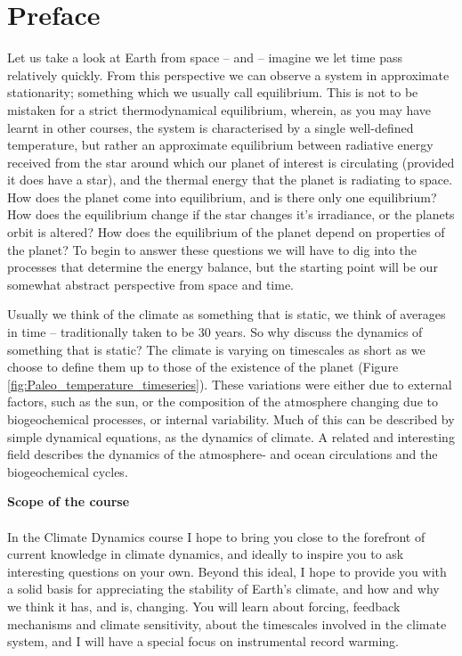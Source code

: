 \documentclass[12pt]{book}
\title{\DocTitle}
\author{Thorsten Mauritsen}
\date{\today}
\begin{document}
 
\maketitle
\tableofcontents



\frontmatter
{}
\chapter{Preface}
Let us take a look at Earth from space -- and -- imagine we let time pass relatively quickly. From this perspective we can observe a system in approximate stationarity; something which we usually call equilibrium. This is not to be mistaken for a strict thermodynamical equilibrium, wherein, as you may have learnt in other courses, the system is characterised by a single well-defined temperature, but rather an approximate equilibrium between radiative energy received from the star around which our planet of interest is circulating (provided it does have a star), and the thermal energy that the planet is radiating to space. How does the planet come into equilibrium, and is there only one equilibrium? How does the equilibrium change if the star changes it's irradiance, or the planets orbit is altered? How does the equilibrium of the planet depend on properties of the planet? To begin to answer these questions we will have to dig into the processes that determine the energy balance, but the starting point will be our somewhat abstract perspective from space and time.

Usually we think of the climate as something that is static, we think of averages in time -- traditionally taken to be 30 years. So why discuss the dynamics of something that is static? The climate is varying on timescales as short as we choose to define them up to those of the existence of the planet (Figure \ref{fig:Paleo_temperature_timeseries}). These variations were either due to external factors, such as the sun, or  the composition of the atmosphere changing due to biogeochemical processes, or internal variability. Much of this can be described by simple dynamical equations, as the dynamics of climate. A related and interesting field describes the dynamics of the atmosphere- and ocean circulations and the biogeochemical cycles. 

\vspace{1.0 cm}
\noindent
{\bf \LARGE Scope of the course}
\\
\\
\noindent In the Climate Dynamics course I hope to bring you close to the forefront of current knowledge in climate dynamics, and ideally to inspire you to ask interesting questions on your own. Beyond this ideal, I hope to provide you with a solid basis for appreciating the stability of Earth's climate, and how and why we think it has, and is, changing. You will learn about forcing, feedback mechanisms and climate sensitivity, about the timescales involved in the climate system, and I will have a special focus on instrumental record warming. 
\end{document}
